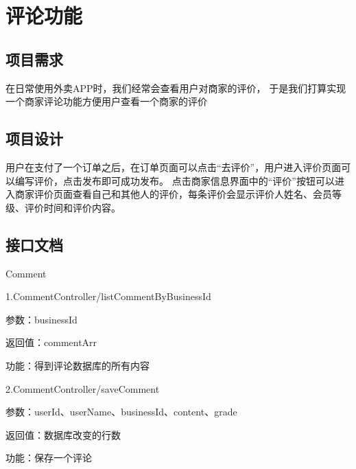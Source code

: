 \section{评论功能}
\subsection{项目需求}
在日常使用外卖APP时，我们经常会查看用户对商家的评价，
于是我们打算实现一个商家评论功能方便用户查看一个商家的评价

\subsection{项目设计}
用户在支付了一个订单之后，在订单页面可以点击“去评价”，用户进入评价页面可以编写评价，点击发布即可成功发布。
点击商家信息界面中的“评价”按钮可以进入商家评价页面查看自己和其他人的评价，每条评价会显示评价人姓名、会员等级、评价时间和评价内容。

\subsection*{接口文档}
Comment

1.CommentController/listCommentByBusinessId

参数：businessId

返回值：commentArr

功能：得到评论数据库的所有内容

2.CommentController/saveComment

参数：userId、userName、businessId、content、grade

返回值：数据库改变的行数

功能：保存一个评论


